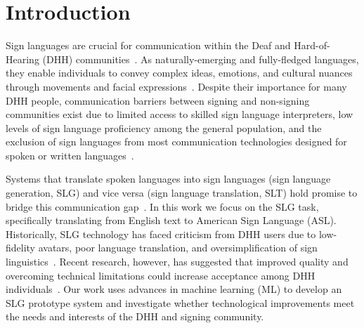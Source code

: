 % 


\section{Introduction}\label{sec:intro}

Sign languages are crucial for communication within the Deaf and Hard-of-Hearing (DHH) communities~\cite{glickman1993deaf,padden1988deaf}. As naturally-emerging and fully-fledged languages, they enable individuals to convey complex ideas, emotions, and cultural nuances through movements and facial expressions~\cite{emmorey2001language,rastgoo_sign_2021}. Despite their importance for many DHH people, communication barriers between signing and non-signing communities exist due to limited access to skilled sign language interpreters, low levels of sign language proficiency among the general population, and the exclusion of sign languages from most communication technologies designed for spoken or written languages~\cite{mitchell2023many,napier2002sign,bragg_sign_2019}. 

Systems that translate spoken languages into sign languages (sign language generation, SLG) and vice versa (sign language translation, SLT) hold promise to bridge this communication gap~\cite{rastgoo_sign_2021, stoll_text2sign_2020}. In this work we focus on the SLG task, specifically translating from English text to American Sign Language (ASL). Historically, SLG technology has faced criticism from DHH users due to low-fidelity avatars, poor language translation, and oversimplification of sign linguistics~\cite{kipp2011assessing,huenerfauth2009sign,huenerfauth2009linguistically}. Recent research, however, has suggested that improved quality and overcoming technical limitations could increase acceptance among DHH individuals~\cite{quandt2022attitudes, inan2024generating}. Our work uses advances in machine learning (ML) to develop an SLG prototype system and investigate whether technological improvements meet the needs and interests of the DHH and signing community. 

